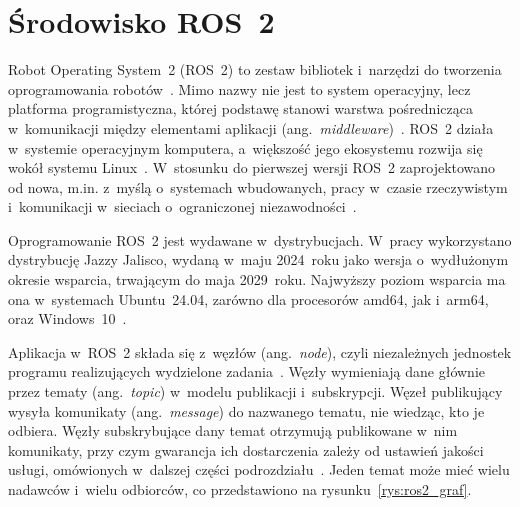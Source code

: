\section{Środowisko ROS~2}
\label{sec:ros2}


Robot Operating System~2 (ROS~2) to zestaw bibliotek i~narzędzi do tworzenia oprogramowania robotów~\cite{ros2jazzy}. Mimo nazwy nie jest to system operacyjny, lecz platforma programistyczna, której podstawę stanowi warstwa pośrednicząca w~komunikacji między elementami aplikacji (ang.~\textit{middleware})~\cite{macenski2022}. ROS~2 działa w~systemie operacyjnym komputera, a~większość jego ekosystemu rozwija się wokół systemu Linux~\cite{ye2023realtime}. W~stosunku do pierwszej wersji ROS~2 zaprojektowano od nowa, m.in. z~myślą o~systemach wbudowanych, pracy w~czasie rzeczywistym i~komunikacji w~sieciach o~ograniczonej niezawodności~\cite{macenski2022}.

Oprogramowanie ROS~2 jest wydawane w~dystrybucjach. W~pracy wykorzystano dystrybucję Jazzy Jalisco, wydaną w~maju 2024~roku jako wersja o~wydłużonym okresie wsparcia, trwającym do maja 2029~roku. Najwyższy poziom wsparcia ma ona w~systemach Ubuntu~24.04, zarówno dla procesorów amd64, jak i~arm64, oraz Windows~10~\cite{ros2jazzyrelease}.

Aplikacja w~ROS~2 składa się z~węzłów (ang.~\textit{node}), czyli niezależnych jednostek programu realizujących wydzielone zadania~\cite{ros2jazzy}. Węzły wymieniają dane głównie przez tematy (ang.~\textit{topic}) w~modelu publikacji i~subskrypcji. Węzeł publikujący wysyła komunikaty (ang.~\textit{message}) do nazwanego tematu, nie wiedząc, kto je odbiera. Węzły subskrybujące dany temat otrzymują publikowane w~nim komunikaty, przy czym gwarancja ich dostarczenia zależy od ustawień jakości usługi, omówionych w~dalszej części podrozdziału~\cite{ros2jazzy}. Jeden temat może mieć wielu nadawców i~wielu odbiorców, co przedstawiono na rysunku~\ref{rys:ros2_graf}.

